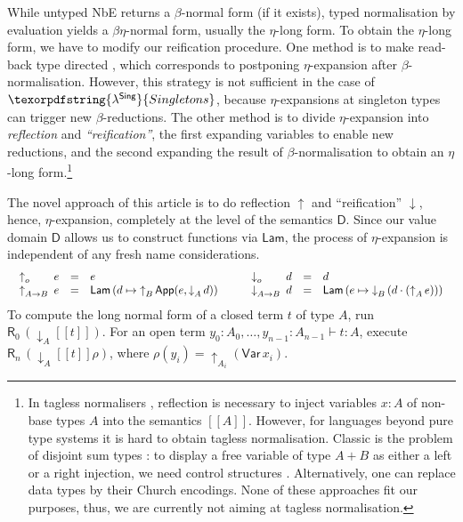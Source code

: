 \documentclass{LMCS}
\theoremstyle{plain}\newtheorem{satz}[thm]{Satz}
\newcommand{\of}{\!:\!}
\newcommand{\derN}{\vdash}
\newcommand{\lambdaSing}{\texorpdfstring{\ensuremath{\lambda^{\mathsf{Sing}}}}{Singletons}}
\newcommand{\den}{\semc}
\newcommand{\Den}{\semc}
\newcommand{\Lam}{\mathsf{Lam}}
\newcommand{\App}{\mathsf{App}}
\newcommand{\D}{\mathsf{D}}
\newcommand{\up}{\upa}
\newcommand{\down}{\da}
\newcommand{\dapp}{\cdot}
\newcommand{\upa}[2]{\mathop{\uparrow}\nolimits_{#1}{#2}}
\newcommand{\da}[2]{\mathop{\downarrow}\nolimits_{#1}{#2}}
\newcommand{\reify}[2]{\mathsf{R}_{#1}\,#2}
\newcommand{\semc}[1]{[\![#1]\!]}
\newcommand{\iVar}[1]{\mathsf{Var}\,x_{#1}}
\begin{document}
While untyped NbE returns a $\beta$-normal form (if it exists), typed
normalisation by evaluation yields a $\beta\eta$-normal form, usually
the $\eta$-long form.  To obtain the $\eta$-long form, we have to
modify our reification procedure.  One method is to make read-back
type directed \cite{abelCoquandDybjer:mpc08}, which corresponds to
postponing $\eta$-expansion after $\beta$-normalisation. 
However, this strategy
is not sufficient in the case of $\lambdaSing$, because
$\eta$-expansions at singleton types can trigger new
$\beta$-reductions.   The other method is to divide $\eta$-expansion
into \emph{reflection} and \emph{``reification''}, the first expanding
variables to enable new reductions, and the second expanding the
result of $\beta$-normalisation to obtain an $\eta$-long
form.\footnote{In tagless normalisers
  \cite{bergerSchwichtenberg:lics91}, 
  reflection is necessary to
  inject variables $x : A$ of non-base types $A$ into the semantics
  $\den A$.  However, for languages beyond pure type systems it is
  hard to obtain tagless normalisation.  Classic is the problem of
  disjoint sum types \cite{altenkirchDybjerHofmannScott:lics01}: to
  display a free variable of type $A + B$ as either a left or a right
  injection, we need control structures
  \cite{balatDiCosmoFiore:popl04}.  Alternatively, one can replace
  data types by their Church encodings.  None of these approaches fit
  our purposes, thus, we are currently not aiming at tagless normalisation.}


The novel approach of this article is to do reflection $\uparrow$ and
``reification'' $\downarrow$, hence, $\eta$-expansion, completely at
the level of
the semantics $\D$.  Since our value domain $\D$ allows us to
construct functions via $\Lam$, the process of $\eta$-expansion is
independent of any fresh name considerations.
\[
\begin{array}{c@{\qquad}c}
  \begin{array}{l@{~}lll}
    \up o        {}& e & = & e \\
    \up{A \to B} {}& e & = & \Lam\,(d \mapsto \up B \App(e,\down A d)) \\
  \end{array}
&
\begin{array}{l@{~}lll}
  \down o         {}& d & = & d \\
  \down {A \to B} {}& d & = & \Lam\,(e \mapsto \down B (d \dapp (\up A
  e))) \\
\end{array}
\end{array}
\]
To compute the long normal form of a closed term $t$ of type $A$, 
run $\reify 0 (\down A {\den t})$.  For an open term $y_0 \of A_0,
\dots, y_{n-1} \of A_{n-1} \derN t : A$, execute $\reify n (\down A
{\Den t \rho})$, where $\rho(y_i) = \up{A_i} {(\iVar i)}$.
\end{document}

